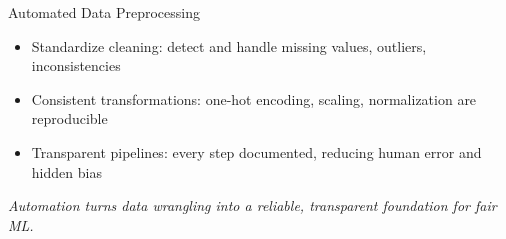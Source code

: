 \documentclass[aspectratio=169]{beamer}
\begin{document}

\begin{frame}{Automated Data Preprocessing}
\begin{itemize}
\item Standardize cleaning: detect and handle missing values, outliers, inconsistencies
\item Consistent transformations: one-hot encoding, scaling, normalization are reproducible
\item Transparent pipelines: every step documented, reducing human error and hidden bias
\end{itemize}

\emph{Automation turns data wrangling into a reliable, transparent foundation for fair ML.}
\end{frame}

\end{document}
